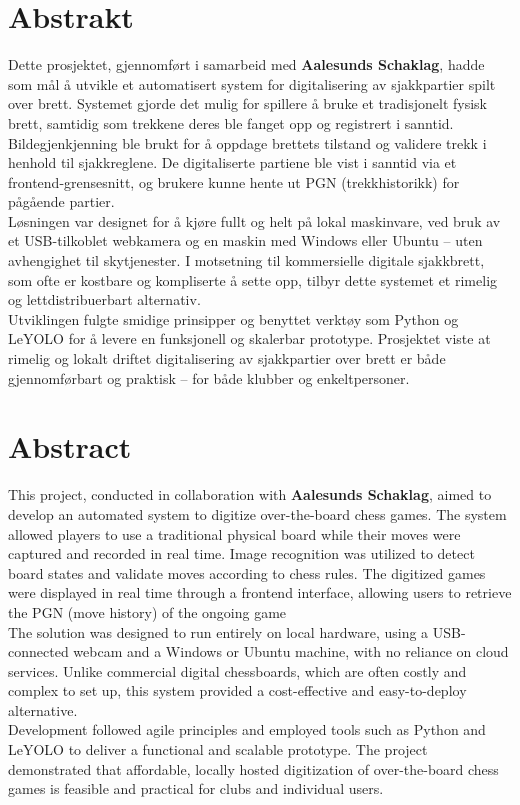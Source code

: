 \chapter*{Abstrakt}

Dette prosjektet, gjennomført i samarbeid med \textbf{Aalesunds Schaklag}, hadde som mål å utvikle et automatisert system for digitalisering av sjakkpartier spilt over brett. Systemet gjorde det mulig for spillere å bruke et tradisjonelt fysisk brett, samtidig som trekkene deres ble fanget opp og registrert i sanntid. Bildegjenkjenning ble brukt for å oppdage brettets tilstand og validere trekk i henhold til sjakkreglene. De digitaliserte partiene ble vist i sanntid via et frontend-grensesnitt, og brukere kunne hente ut PGN (trekkhistorikk) for pågående partier. \\

Løsningen var designet for å kjøre fullt og helt på lokal maskinvare, ved bruk av et USB-tilkoblet webkamera og en maskin med Windows eller Ubuntu – uten avhengighet til skytjenester. I motsetning til kommersielle digitale sjakkbrett, som ofte er kostbare og kompliserte å sette opp, tilbyr dette systemet et rimelig og lettdistribuerbart alternativ. \\

Utviklingen fulgte smidige prinsipper og benyttet verktøy som Python og LeYOLO for å levere en funksjonell og skalerbar prototype. Prosjektet viste at rimelig og lokalt driftet digitalisering av sjakkpartier over brett er både gjennomførbart og praktisk – for både klubber og enkeltpersoner.

\newpage

\chapter*{Abstract}
This project, conducted in collaboration with \textbf{Aalesunds Schaklag}, aimed to develop an automated system to digitize over-the-board chess games. The system allowed players to use a traditional physical board while their moves were captured and recorded in real time. Image recognition was utilized to detect board states and validate moves according to chess rules. The digitized games were displayed in real time through a frontend interface, allowing users to retrieve the PGN (move history) of the ongoing game \\

The solution was designed to run entirely on local hardware, using a USB-connected webcam and a Windows or Ubuntu machine, with no reliance on cloud services. Unlike commercial digital chessboards, which are often costly and complex to set up, this system provided a cost-effective and easy-to-deploy alternative. \\

Development followed agile principles and employed tools such as Python and LeYOLO to deliver a functional and scalable prototype. The project demonstrated that affordable, locally hosted digitization of over-the-board chess games is feasible and practical for clubs and individual users.